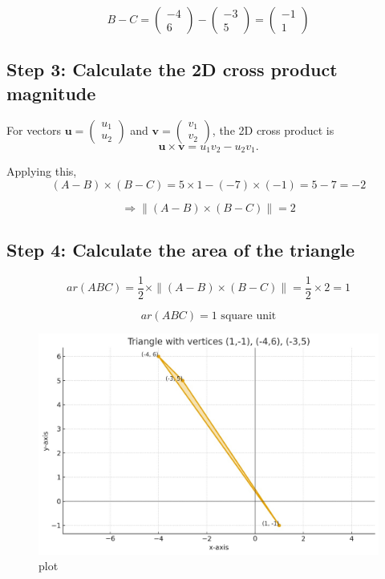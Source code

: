 \documentclass[journal]{IEEEtran}
\begin{document}
\[
B - C = \begin{pmatrix} -4 \\ 6 \end{pmatrix} - \begin{pmatrix} -3 \\ 5 \end{pmatrix} 
= \begin{pmatrix} -1 \\ 1 \end{pmatrix}
\]

\subsection*{Step 3: Calculate the 2D cross product magnitude}
For vectors \(\mathbf{u} = \begin{pmatrix} u_1 \\ u_2 \end{pmatrix}\) and \(\mathbf{v} = \begin{pmatrix} v_1 \\ v_2 \end{pmatrix}\), the 2D cross product is
\[
\mathbf{u} \times \mathbf{v} = u_1 v_2 - u_2 v_1.
\]

Applying this,
\[
(A-B) \times (B-C) = 5 \times 1 - (-7) \times (-1) = 5 - 7 = -2
\]

\[
\Rightarrow \| (A-B) \times (B-C) \| = 2
\]

\subsection*{Step 4: Calculate the area of the triangle}
\[
ar(ABC) = \frac{1}{2} \times \| (A-B) \times (B-C) \| = \frac{1}{2} \times 2 = 1
\]

\[
\boxed{ar(ABC) = 1 \text{ square unit}}
\]


\begin{figure}[htbp]
\centering
\includegraphics[width=0.8\columnwidth]{figs/python_plot.png} 
\caption{plot}
\label{fig:1}
\end{figure}
\end{document}
